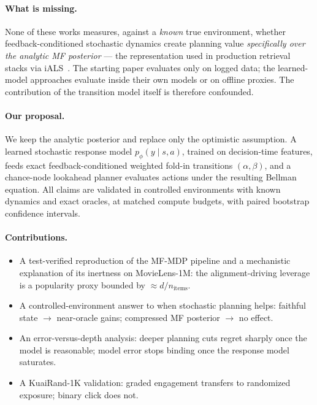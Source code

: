 \documentclass[11pt,a4paper]{article}
\begin{document}
\paragraph{What is missing.}
None of these works measures, against a \emph{known} true environment, whether
feedback-conditioned stochastic dynamics create planning value \emph{specifically over
the analytic MF posterior} --- the representation used in production retrieval stacks
via iALS~\cite{hu2008ials,rendle2022ials}. The starting paper evaluates only on logged
data; the learned-model approaches evaluate inside their own models or on offline
proxies. The contribution of the transition model itself is therefore confounded.

\paragraph{Our proposal.}
We keep the analytic posterior and replace only the optimistic assumption. A learned
stochastic response model $p_\phi(y \mid s, a)$, trained on decision-time features,
feeds exact feedback-conditioned weighted fold-in transitions $(\alpha, \beta)$, and a
chance-node lookahead planner evaluates actions under the resulting Bellman equation.
All claims are validated in controlled environments with known dynamics and exact
oracles, at matched compute budgets, with paired bootstrap confidence intervals.

\paragraph{Contributions.}
\begin{itemize}
  \item A test-verified reproduction of the MF-MDP pipeline and a mechanistic
  explanation of its inertness on MovieLens-1M: the alignment-driving leverage is a
  popularity proxy bounded by $\approx d/n_{\text{items}}$.
  \item A controlled-environment answer to when stochastic planning helps: faithful
  state $\rightarrow$ near-oracle gains; compressed MF posterior $\rightarrow$ no effect.
  \item An error-versus-depth analysis: deeper planning cuts regret sharply once the
  model is reasonable; model error stops binding once the response model saturates.
  \item A KuaiRand-1K validation: graded engagement transfers to randomized exposure;
  binary click does not.
\end{itemize}
\end{document}
